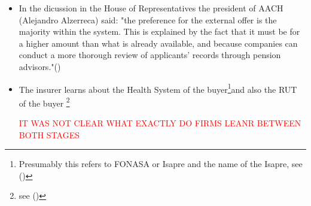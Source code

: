 \documentclass[12pt]{article}
\theoremstyle{plain}
\theoremstyle{plain}
\begin{document}
\begin{itemize}
    \item In the dicussion in the House of Representatives the president of AACH (Alejandro Alzerreca) said: "the preference for the external offer is the majority within the system. This is explained by the fact that it must be for a higher amount than what is already available, and because companies can conduct a more thorough review of applicants' records through pension advisors."(\cite[p.~157]{comision_trabajo_y_seguridad_social_informe_2024})

    \item The insurer learns about the Health System of the buyer\footnote{Presumably this refers to FONASA or Isapre and the name of the Isapre, see (\cite[p.~769-72]{superintendencia_de_pensiones_compendio_nodate})}and also the RUT of the buyer \footnote{see 
    (\cite[p.~606-7]{superintendencia_de_pensiones_compendio_nodate})}

    \textcolor{red}{IT WAS NOT CLEAR WHAT EXACTLY DO FIRMS LEANR BETWEEN BOTH STAGES}
\end{itemize}

\printbibliography
\end{document}
